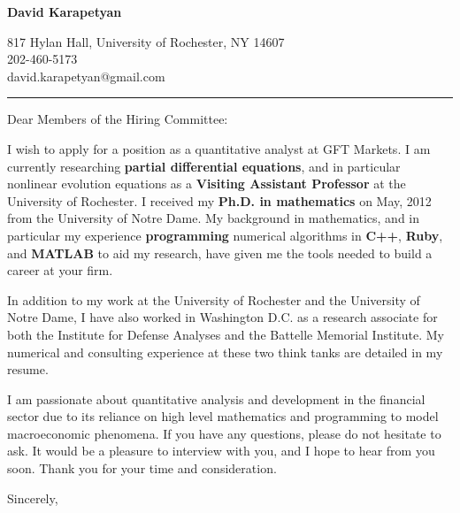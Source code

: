 \documentclass[12pt]{letter}
\date{\vspace{0.5cm}\flushleft}
\begin{document}
\begin{letter}{}
\begin{center}
{\bf {\Large David Karapetyan}}
\end{center}

\begin{center}
{817 Hylan Hall, University of Rochester, NY 14607  \\ 
202-460-5173 \\  david.karapetyan@gmail.com
}
\end{center}
\hrule

\opening{Dear Members of the Hiring Committee:\\}
%
%
I wish to apply for a position as a quantitative analyst at GFT Markets. I am currently researching \textbf{partial differential equations}, and in particular nonlinear evolution equations as a \textbf{Visiting Assistant Professor} at the University of Rochester. I received my \textbf{Ph.D. in mathematics} on May, 2012 from the University of Notre Dame. My
background in mathematics, and in particular my experience
\textbf{programming} numerical algorithms in \textbf{C++}, \textbf{Ruby}, and \textbf{MATLAB}
to aid my research, have given me the tools needed to build a career at your firm.

In addition to my work at the University of Rochester and the University of Notre Dame, I have also worked in Washington D.C. as a research
associate for both the Institute for Defense Analyses and the Battelle Memorial
Institute. My numerical and consulting experience at these two think tanks are
detailed in my resume. 

I am passionate about quantitative analysis and development in the financial
sector due to its reliance on high level mathematics and programming to model
macroeconomic phenomena. If you have any questions, please do not hesitate to
ask. It would be a pleasure to interview with you, and I hope to hear from you
soon. Thank you for your time and consideration. 

\closing{Sincerely,}


\end{letter}
\end{document}
